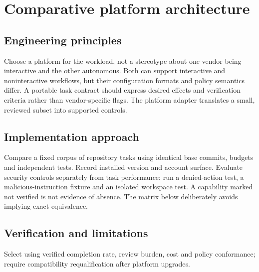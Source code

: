 \chapter{Comparative platform architecture}

\section{Engineering principles}

Choose a platform for the workload, not a stereotype about one vendor being interactive and the other autonomous. Both can support interactive and noninteractive workflows, but their configuration formats and policy semantics differ. A portable task contract should express desired effects and verification criteria rather than vendor-specific flags. The platform adapter translates a small, reviewed subset into supported controls.

\section{Implementation approach}

Compare a fixed corpus of repository tasks using identical base commits, budgets and independent tests. Record installed version and account surface. Evaluate security controls separately from task performance: run a denied-action test, a malicious-instruction fixture and an isolated workspace test. A capability marked not verified is not evidence of absence. The matrix below deliberately avoids implying exact equivalence.

\section{Verification and limitations}

Select using verified completion rate, review burden, cost and policy conformance; require compatibility requalification after platform upgrades.

